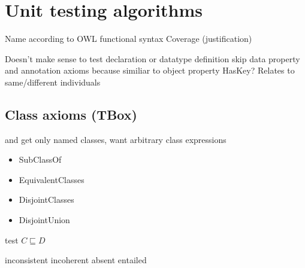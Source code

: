 \documentclass[paper.tex]{subfiles}
\begin{document}
\section{Unit testing algorithms}
\label{sec:algorithms}

\begin{todos}
  \todo Name according to OWL functional syntax
  \todo Coverage (justification)
  \begin{todos}
    \todo Doesn't make sense to test declaration or data\-type definition
    \todo skip data property and annotation axioms because similiar to object property
    \todo HasKey?  Relates to same/different individuals
  \end{todos}
\end{todos}

\subsection{Class axioms (TBox)}

\begin{todos}
  \todo {} and  get only named classes, want arbitrary class expressions
\end{todos}

\begin{itemize}[noitemsep]
  \ttfamily
  \item SubClassOf
  \item EquivalentClasses
  \item DisjointClasses
  \item DisjointUnion
\end{itemize}

\begin{algorithm}[H]
  \caption{test $C \sqsubseteq D$}
  \begin{algorithmic}[1]
    \raggedright
        \State \Return inconsistent
        \State \Return incoherent
        \State \Return absent
      \Else
        \State \Return entailed
      \EndIf
    \EndFunction
  \end{algorithmic}
\end{algorithm}
\end{document}
